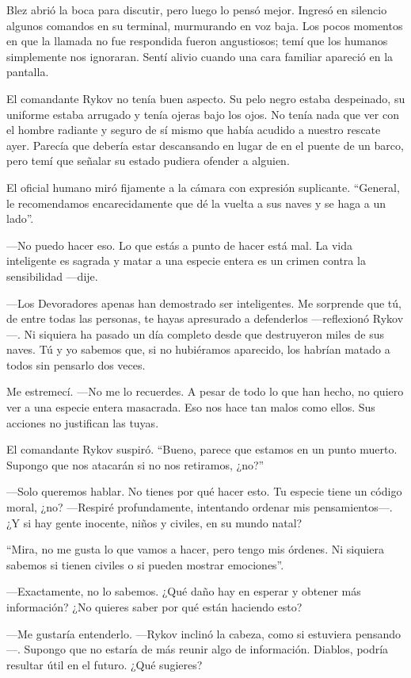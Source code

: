 Blez abrió la boca para discutir, pero luego lo pensó mejor. Ingresó en silencio algunos comandos en su terminal, murmurando en voz baja. Los pocos momentos en que la llamada no fue respondida fueron angustiosos; temí que los humanos simplemente nos ignoraran. Sentí alivio cuando una cara familiar apareció en la pantalla.

El comandante Rykov no tenía buen aspecto. Su pelo negro estaba despeinado, su uniforme estaba arrugado y tenía ojeras bajo los ojos. No tenía nada que ver con el hombre radiante y seguro de sí mismo que había acudido a nuestro rescate ayer. Parecía que debería estar descansando en lugar de en el puente de un barco, pero temí que señalar su estado pudiera ofender a alguien.

El oficial humano miró fijamente a la cámara con expresión suplicante. “General, le recomendamos encarecidamente que dé la vuelta a sus naves y se haga a un lado”.

—No puedo hacer eso. Lo que estás a punto de hacer está mal. La vida inteligente es sagrada y matar a una especie entera es un crimen contra la sensibilidad —dije.

—Los Devoradores apenas han demostrado ser inteligentes. Me sorprende que tú, de entre todas las personas, te hayas apresurado a defenderlos —reflexionó Rykov—. Ni siquiera ha pasado un día completo desde que destruyeron miles de sus naves. Tú y yo sabemos que, si no hubiéramos aparecido, los habrían matado a todos sin pensarlo dos veces.

Me estremecí. —No me lo recuerdes. A pesar de todo lo que han hecho, no quiero ver a una especie entera masacrada. Eso nos hace tan malos como ellos. Sus acciones no justifican las tuyas.

El comandante Rykov suspiró. “Bueno, parece que estamos en un punto muerto. Supongo que nos atacarán si no nos retiramos, ¿no?”

—Solo queremos hablar. No tienes por qué hacer esto. Tu especie tiene un código moral, ¿no? —Respiré profundamente, intentando ordenar mis pensamientos—. ¿Y si hay gente inocente, niños y civiles, en su mundo natal?

“Mira, no me gusta lo que vamos a hacer, pero tengo mis órdenes. Ni siquiera sabemos si tienen civiles o si pueden mostrar emociones”.

—Exactamente, no lo sabemos. ¿Qué daño hay en esperar y obtener más información? ¿No quieres saber por qué están haciendo esto?

—Me gustaría entenderlo. —Rykov inclinó la cabeza, como si estuviera pensando—. Supongo que no estaría de más reunir algo de información. Diablos, podría resultar útil en el futuro. ¿Qué sugieres?

